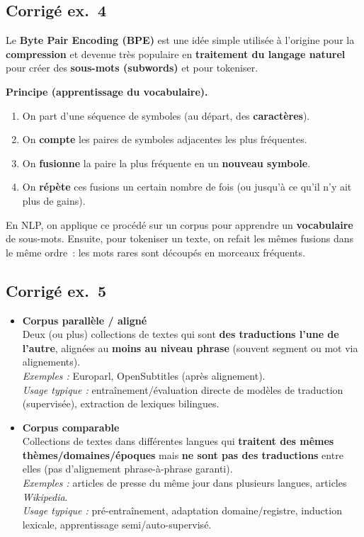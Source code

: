 \documentclass[11pt,a4paper]{article}
\begin{document}
\begin{description}[
  leftmargin=0pt,
  style=nextline,
  font=\normalfont,
  itemsep=1.0\baselineskip,
  parsep=0pt
]
\subsection*{Corrigé ex.~4}

Le \textbf{Byte Pair Encoding (BPE)} est une idée simple utilisée à l’origine pour la \textbf{compression} et devenue très populaire en \textbf{traitement du langage naturel} pour créer des \textbf{sous-mots (subwords)} et pour tokeniser.

\medskip
\noindent\textbf{Principe (apprentissage du vocabulaire).}
\begin{enumerate}[leftmargin=*]
  \item On part d’une séquence de symboles (au départ, des \textbf{caractères}).
  \item On \textbf{compte} les paires de symboles adjacentes les plus fréquentes.
  \item On \textbf{fusionne} la paire la plus fréquente en un \textbf{nouveau symbole}.
  \item On \textbf{répète} ces fusions un certain nombre de fois (ou jusqu’à ce qu’il n’y ait plus de gains).
\end{enumerate}

\noindent En NLP, on applique ce procédé sur un corpus pour apprendre un \textbf{vocabulaire} de sous-mots. Ensuite, pour tokeniser un texte, on refait les mêmes fusions dans le même ordre~: les mots rares sont découpés en morceaux fréquents.

\subsection*{Corrigé ex.~5}

\begin{itemize}[leftmargin=*]
  \item \textbf{Corpus parallèle / aligné}\\
  Deux (ou plus) collections de textes qui sont \textbf{des traductions l’une de l’autre}, alignées au \textbf{moins au niveau phrase} (souvent segment ou mot via alignements).\\
  \emph{Exemples :} Europarl, OpenSubtitles (après alignement).\\
  \emph{Usage typique :} entraînement/évaluation directe de modèles de traduction (supervisée), extraction de lexiques bilingues.

  \item \textbf{Corpus comparable}\\
  Collections de textes dans différentes langues qui \textbf{traitent des mêmes thèmes/domaines/époques} mais \textbf{ne sont pas des traductions} entre elles (pas d’alignement phrase-à-phrase garanti).\\
  \emph{Exemples :} articles de presse du même jour dans plusieurs langues, articles \textit{Wikipedia}.\\
  \emph{Usage typique :} pré-entraînement, adaptation domaine/registre, induction lexicale, apprentissage semi/auto-supervisé.
\end{itemize}


\end{description}
\end{document}
